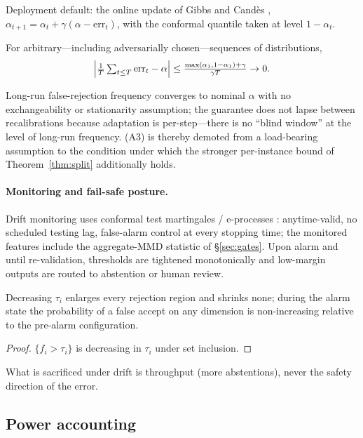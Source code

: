 Deployment default: the online update of Gibbs and Cand\`es \cite{gibbs2021},
$\alpha_{t+1}=\alpha_t+\gamma(\alpha-\mathrm{err}_t)$, with the conformal
quantile taken at level $1-\alpha_t$.

\begin{theorem}
\label{thm:aci}
For arbitrary---including adversarially chosen---sequences of distributions,
\[
\Bigl|\tfrac1T\textstyle\sum_{t\le T}\mathrm{err}_t-\alpha\Bigr|
\le\frac{\max(\alpha_1,1-\alpha_1)+\gamma}{\gamma T}\to 0 .
\]
\end{theorem}

Long-run false-rejection frequency converges to nominal $\alpha$ with no
exchangeability or stationarity assumption; the guarantee does not lapse
between recalibrations because adaptation is per-step---there is no ``blind
window'' at the level of long-run frequency. (A3) is thereby demoted from a
load-bearing assumption to the condition under which the stronger per-instance
bound of Theorem~\ref{thm:split} additionally holds.

\paragraph{Monitoring and fail-safe posture.} Drift monitoring uses conformal
test martingales / e-processes \cite{vovk2021}: anytime-valid, no scheduled
testing lag, false-alarm control at every stopping time; the monitored
features include the aggregate-MMD statistic of \S\ref{sec:gates}. Upon alarm
and until re-validation, thresholds are tightened monotonically and low-margin
outputs are routed to abstention or human review.

\begin{proposition}
\label{prop:safeside}
Decreasing $\tau_i$ enlarges every rejection region and shrinks none; during
the alarm state the probability of a false accept on any dimension is
non-increasing relative to the pre-alarm configuration.
\end{proposition}
\begin{proof}
$\{f_i>\tau_i\}$ is decreasing in $\tau_i$ under set inclusion.
\end{proof}

What is sacrificed under drift is throughput (more abstentions), never the
safety direction of the error.

\subsection{Power accounting}
\label{sec:power}

